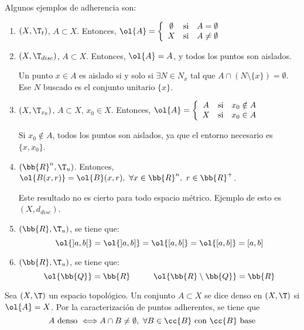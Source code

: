 \begin{ejemplo} Algunos ejemplos de adherencia son:
\begin{enumerate}
    \item $(X,\T_{t})$, $A\subset X$. Entonces, $\ol{A}=\left\{\begin{array}{ccc}
        \emptyset & \text{si} & A=\emptyset \\
        X & \text{si} & A\neq\emptyset
    \end{array}\right.$

    \item $(X,\T_{disc})$, $A\subset X$. Entonces, $\ol{A}=A$, y todos los puntos son aislados. 

    Un punto $x\in A$ es aislado si y solo si $\exists N\in N_x$ tal que $A\cap (N\setminus\{x\})= \emptyset$. Ese $N$ buscado es el conjunto unitario $\{x\}$.

    \item $(X,\T_{x_0})$, $A\subset X$, $x_0\in X$. Entonces, $\ol{A}=\left\{\begin{array}{ccc}
        A & \text{si} & x_0\notin A \\
        X & \text{si} & x_0\in A
    \end{array}\right.$

    Si $x_0\notin A$, todos los puntos son aislados, ya que el entorno necesario es $\{x,x_0\}$.

    \item $(\bb{R}^n,\T_{u})$. Entonces, $\ol{B(x,r)}=\ol{B}(x,r),~\forall x\in \bb{R}^n,~r\in \bb{R}^+$.
    
    Este resultado no es cierto para todo espacio métrico. Ejemplo de esto es $(X,d_{disc})$.

    \item $(\bb{R},\T_{u})$, se tiene que:
    \begin{equation*}
        \ol{]a,b[} = \ol{]a,b]} = \ol{[a,b[} = \ol{[a,b]} = [a,b]
    \end{equation*}

    \item $(\bb{R}, \T_u)$, se tiene que:
    \begin{equation*}
        \ol{\bb{Q}} =\bb{R} \hspace{1cm} \ol{\bb{R}\setminus \bb{Q}}=\bb{R}
    \end{equation*}
\end{enumerate}
\end{ejemplo}


\begin{definicion}
    Sea $(X,\T)$ un espacio topológico. Un conjunto $A\subset X$ se dice denso en $(X,\T)$ si $\ol{A}=X$. Por la caracterización de puntos adherentes, se tiene que
    \begin{equation*}
        A \text{ denso }\Longleftrightarrow A\cap B\neq \emptyset,~\forall B\in \cc{B} \text{ con $\cc{B}$ base}
    \end{equation*}
\end{definicion}

